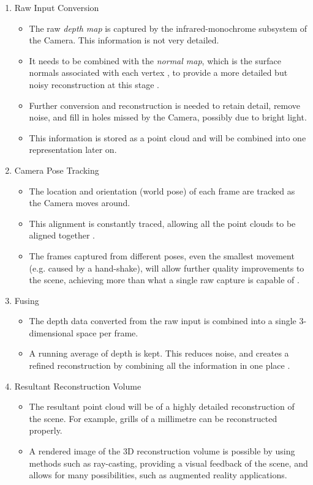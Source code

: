 \documentclass[lit_review.tex]{subfiles}
\begin{document}
\begin{enumerate}
  \item Raw Input Conversion
    \begin{itemize}
      \item The raw \textit{depth map} is captured by the infrared-monochrome subsystem of the Camera. This information is not very detailed.  
      \item It needs to be combined with the \textit{normal map}, which is the surface normals associated with each vertex \cite{szeliski-book}, to provide a more detailed but noisy reconstruction at this stage \cite{kinect-research}. 
      \item Further conversion and reconstruction is needed to retain detail, remove noise, and fill in holes missed by the Camera, possibly due to bright light.
      \item This information is stored as a point cloud and will be combined into one representation later on.
    \end{itemize}

  \item Camera Pose Tracking
    \begin{itemize}
      \item The location and orientation (world pose) of each frame are tracked as the Camera moves around.
      \item This alignment is constantly traced, allowing all the point clouds to be aligned together \cite{kinect-doc}. 
      \item The frames captured from different poses, even the smallest movement (e.g. caused by a hand-shake), will allow further quality improvements to the scene, achieving more than what a single raw capture is capable of \cite{ms-3d-paper}.
    \end{itemize}

  \item Fusing 
    \begin{itemize}
      \item The depth data converted from the raw input is combined into a single 3-dimensional space per frame.
      \item A running average of depth is kept. This reduces noise, and creates a refined reconstruction by combining all the information in one place \cite{kinect-doc} \cite{ms-3d-paper}. 
    \end{itemize}

  \item Resultant Reconstruction Volume
    \begin{itemize}
      \item The resultant point cloud will be of a highly detailed reconstruction of the scene. For example, grills of a millimetre \cite{3d-paper} can be reconstructed properly.
      \item A rendered image of the 3D reconstruction volume is possible by using methods such as ray-casting, providing a visual feedback of the scene, and allows for many possibilities, such as augmented reality applications.
    \end{itemize}
\end{enumerate}
\end{document}
